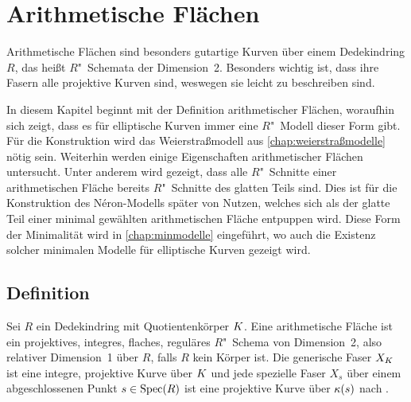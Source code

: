 \chapter{Arithmetische Flächen}\label{chap:arithmetischeflächen}
Arithmetische Flächen sind besonders gutartige Kurven über
einem Dedekindring $R$, das heißt $R$"~Schemata der Dimension~2.
Besonders wichtig ist, dass ihre Fasern alle projektive Kurven sind,
weswegen sie leicht zu beschreiben sind.

In diesem Kapitel beginnt mit der Definition arithmetischer Flächen,
woraufhin sich zeigt, dass es für elliptische Kurven immer eine
$R$"~Modell dieser Form gibt. Für die Konstruktion wird das Weierstraßmodell
aus \autoref{chap:weierstraßmodelle} nötig sein.
Weiterhin werden einige Eigenschaften arithmetischer Flächen
untersucht. Unter anderem wird gezeigt, dass alle $R$"~Schnitte einer
arithmetischen Fläche bereits $R$"~Schnitte des glatten Teils
sind. Dies ist für die Konstruktion des Néron-Modells später von
Nutzen, welches sich als der glatte Teil einer minimal gewählten
arithmetischen Fläche entpuppen wird.
Diese Form der Minimalität wird in \autoref{chap:minmodelle}
eingeführt, wo auch die Existenz solcher minimalen Modelle für
elliptische Kurven gezeigt wird.

\section{Definition}
\begin{Definition}
  Sei $R$ ein Dedekindring mit Quotientenkörper $K$.
  Eine arithmetische Fläche ist ein projektives, integres, flaches,
  reguläres $R$"~Schema von Dimension~2, also relativer Dimension~1 über
  $R$, falls $R$ kein Körper ist.
  Die generische Faser $X_{K}$ ist eine integre, projektive Kurve über
  $K$ und jede spezielle Faser $X_s$ über einem abgeschlossenen Punkt
  $s\in\operatorname{Spec}(R)$ ist eine projektive Kurve über $\kappa(s)$ nach
  \cite[Lemma~8.3.3]{liu}.
\end{Definition}

